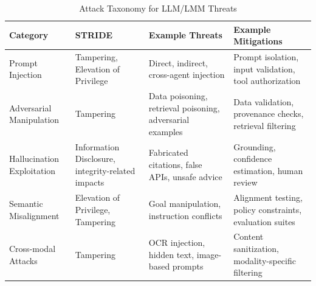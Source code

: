 \documentclass[a4paper,12pt]{report}
\begin{document}
\begin{table}[ht]
\centering
\caption{Attack Taxonomy for LLM/LMM Threats}
\label{tab:attack_taxonomy}
\renewcommand{\arraystretch}{1.15}
\small
\begin{tabularx}{\textwidth}{|p{2.6cm}|p{2.8cm}|p{3.2cm}|X|}
\hline
\textbf{Category} &
\textbf{STRIDE} &
\textbf{Example Threats} &
\textbf{Example Mitigations} \\
\hline
Prompt Injection &
Tampering, Elevation of Privilege &
Direct, indirect, cross-agent injection &
Prompt isolation, input validation, tool authorization \\
\hline
Adversarial Manipulation &
Tampering &
Data poisoning, retrieval poisoning, adversarial examples &
Data validation, provenance checks, retrieval filtering \\
\hline
Hallucination Exploitation &
Information Disclosure, integrity-related impacts &
Fabricated citations, false APIs, unsafe advice &
Grounding, confidence estimation, human review \\
\hline
Semantic Misalignment &
Elevation of Privilege, Tampering &
Goal manipulation, instruction conflicts &
Alignment testing, policy constraints, evaluation suites \\
\hline
Cross-modal Attacks &
Tampering &
OCR injection, hidden text, image-based prompts &
Content sanitization, modality-specific filtering \\
\hline
\end{tabularx}
\end{table}
\FloatBarrier
\end{document}
